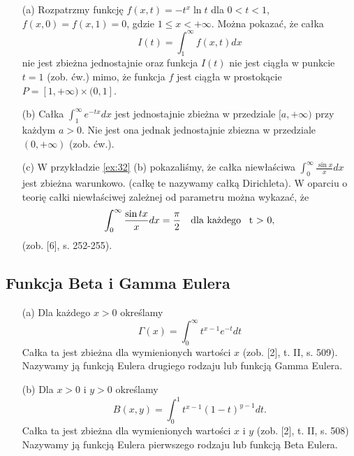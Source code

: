 \documentclass[leqno]{article}
\begin{document}
\begin{justify}
\begin{ex}
    \begin{itemize}
        \item [(a)] Rozpatrzmy funkcję $f(x,t) = -t^x\ln t$ dla $0 < t < 1$, $f(x, 0) = f(x,1) = 0$,
            gdzie $1 \leqslant x < +\infty$. Można pokazać, że całka 
            \[
                I(t) = \int_{1}^{\infty}f(x,t)dx
            \]
            nie jest zbieżna jednostajnie oraz funkcja $I(t)$ nie jest ciągła w punkcie $t = 1$ (zob. ćw.)
            mimo, że funkcja $f$ jest ciągła w prostokącie $P = [1, +\infty) \times (0, 1]$.
        \item [(b)]
            Całka $\int_{1}^{\infty}e^{-tx}dx$ jest jednostajnie zbieżna w przedziale $[a,+\infty)$ przy każdym $a > 0$.
            Nie jest ona jednak jednostajnie zbiezna w przedziale $(0, +\infty)$ (zob. ćw.).
        \item [(c)]
            W przykładzie \ref{ex:32} (b) pokazaliśmy, że całka niewłaściwa $\int_{0}^{\infty}\frac{\sin x}{x}dx$ jest zbieżna warunkowo.
            (całkę te nazywamy całką Dirichleta). W oparciu o teorię całki niewłaściwej zależnej od parametru można wykazać, że 
            \[
                \int_{0}^{\infty}\frac{\sin tx}{x}dx = \frac{\pi}{2} \quad \text{dla każdego \, t > 0},
            \]
            (zob. [6], s. 252-255).
    \end{itemize}
\end{ex}

\newpage

\subsection{Funkcja Beta i Gamma Eulera}

\begin{defn}
    \begin{itemize}
        \item [(a)]
            Dla każdego $x > 0$ określamy 
            \[
                \Gamma(x) = \int_{0}^{\infty}t^{x-1}e^{-t}dt
            \]
            Całka ta jest zbieżna dla wymienionych wartości $x$ (zob. [2], t. II, s. 509). Nazywamy ją funkcją Eulera drugiego rodzaju
            lub funkcją Gamma Eulera.
        \item [(b)]
            Dla $x > 0$ i $y > 0$ określamy 
            \[
                B(x,y) = \int_{0}^{1}t^{x-1}{(1-t)}^{y-1}dt.
            \]
            Całka ta jest zbieżna dla wymienionych wartości $x$ i $y$ (zob. [2], t. II, s. 508)
            Nazywamy ją funkcją Eulera pierwszego rodzaju lub funkcją Beta Eulera.
    \end{itemize}
\end{defn}


\end{justify}
\end{document}
